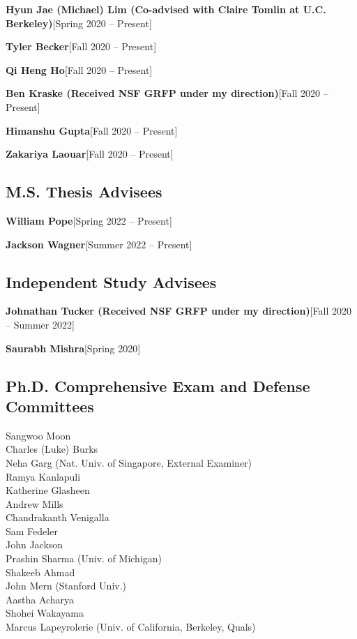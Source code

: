 \documentclass[10pt,roman]{moderncv}
\newcommand{\mycvitem}[2]{
    \textbf{#2}\hfill [#1]\break
}
\begin{document}
\mycvitem{Spring 2020 -- Present}{Hyun Jae (Michael) Lim {\normalfont(Co-advised with Claire Tomlin at U.C. Berkeley)}}
\mycvitem{Fall 2020 -- Present}{Tyler Becker}
\mycvitem{Fall 2020 -- Present}{Qi Heng Ho}
\mycvitem{Fall 2020 -- Present}{Ben Kraske {\normalfont(Received NSF GRFP under my direction)}}
\mycvitem{Fall 2020 -- Present}{Himanshu Gupta}
\mycvitem{Fall 2020 -- Present}{Zakariya Laouar}

\subsection{M.S. Thesis Advisees}
\mycvitem{Spring 2022 -- Present}{William Pope}
\mycvitem{Summer 2022 -- Present}{Jackson Wagner}

\subsection{Independent Study Advisees}
\mycvitem{Fall 2020 -- Summer 2022}{Johnathan Tucker {\normalfont(Received NSF GRFP under my direction)}}
\mycvitem{Spring 2020}{Saurabh Mishra}

\begin{minipage}{\textwidth}
\subsection{Ph.D. Comprehensive Exam and Defense Committees}
\begin{multicols}{2}
    \small
    Sangwoo Moon\\
    Charles (Luke) Burks\\
    Neha Garg (Nat. Univ. of Singapore, External Examiner)\\
    Ramya Kanlapuli\\
    Katherine Glasheen\\
    Andrew Mills\\
    Chandrakanth Venigalla\\
    Sam Fedeler\\
    John Jackson\\
    Prashin Sharma (Univ. of Michigan)\\
    Shakeeb Ahmad\\
    John Mern (Stanford Univ.)\\
    Aastha Acharya\\
    Shohei Wakayama \\
    Marcus Lapeyrolerie (Univ. of California, Berkeley, Quals)
\end{multicols}
\end{minipage}\\
\\
\end{document}
